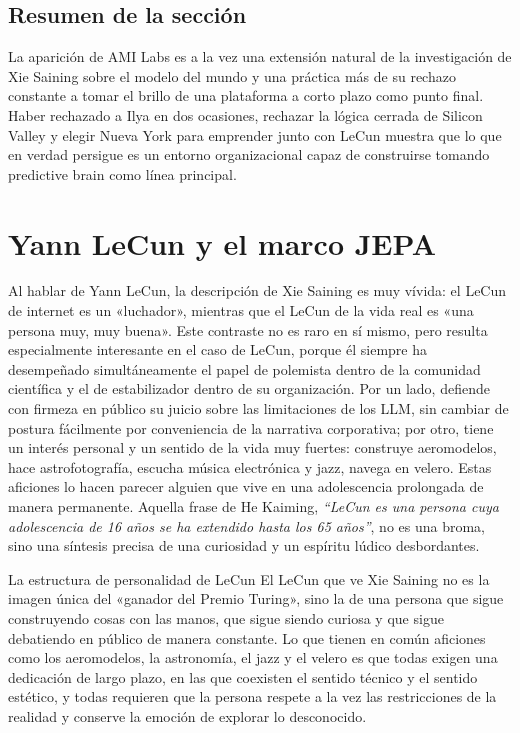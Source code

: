 \documentclass[a4paper,12pt]{article}
\begin{document}
\subsection{Resumen de la sección}

La aparición de AMI Labs es a la vez una extensión natural de la investigación de Xie Saining sobre el modelo del mundo y una práctica más de su rechazo constante a tomar el brillo de una plataforma a corto plazo como punto final. Haber rechazado a Ilya en dos ocasiones, rechazar la lógica cerrada de Silicon Valley y elegir Nueva York para emprender junto con LeCun muestra que lo que en verdad persigue es un entorno organizacional capaz de construirse tomando predictive brain como línea principal.
\section{Yann LeCun y el marco JEPA}

Al hablar de Yann LeCun, la descripción de Xie Saining es muy vívida: el LeCun de internet es un «luchador», mientras que el LeCun de la vida real es «una persona muy, muy buena». Este contraste no es raro en sí mismo, pero resulta especialmente interesante en el caso de LeCun, porque él siempre ha desempeñado simultáneamente el papel de polemista dentro de la comunidad científica y el de estabilizador dentro de su organización. Por un lado, defiende con firmeza en público su juicio sobre las limitaciones de los LLM, sin cambiar de postura fácilmente por conveniencia de la narrativa corporativa; por otro, tiene un interés personal y un sentido de la vida muy fuertes: construye aeromodelos, hace astrofotografía, escucha música electrónica y jazz, navega en velero. Estas aficiones lo hacen parecer alguien que vive en una adolescencia prolongada de manera permanente. Aquella frase de He Kaiming, \textit{``LeCun es una persona cuya adolescencia de 16 años se ha extendido hasta los 65 años''}, no es una broma, sino una síntesis precisa de una curiosidad y un espíritu lúdico desbordantes.

\begin{knowledgebox}{La estructura de personalidad de LeCun}
El LeCun que ve Xie Saining no es la imagen única del «ganador del Premio Turing», sino la de una persona que sigue construyendo cosas con las manos, que sigue siendo curiosa y que sigue debatiendo en público de manera constante. Lo que tienen en común aficiones como los aeromodelos, la astronomía, el jazz y el velero es que todas exigen una dedicación de largo plazo, en las que coexisten el sentido técnico y el sentido estético, y todas requieren que la persona respete a la vez las restricciones de la realidad y conserve la emoción de explorar lo desconocido.
\end{knowledgebox}
\end{document}
